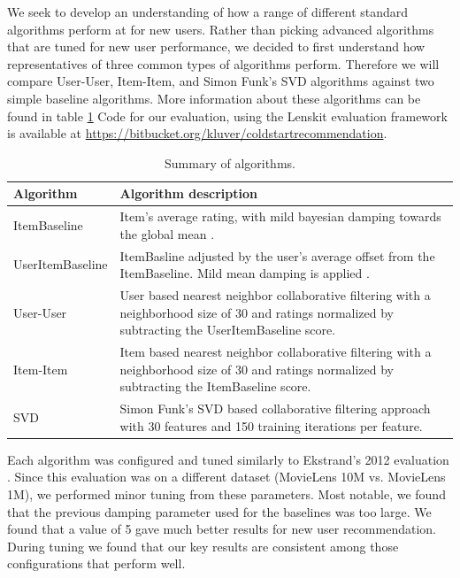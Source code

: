 \documentclass[letterpaper]{sig-alternate}
\begin{document}
  We seek to develop an understanding of how a range of different standard algorithms perform at for new users.
  Rather than picking advanced algorithms that are tuned for new user performance, we decided to first understand how representatives of three common types of algorithms perform.
  Therefore we will compare User-User, Item-Item, and Simon Funk's SVD algorithms against two simple baseline algorithms.
  More information about these algorithms can be found in table \ref{tbl:algo}
  Code for our evaluation, using the Lenskit evaluation framework \cite{lenskit} is available at \url{https://bitbucket.org/kluver/coldstartrecommendation}.
  
  \begin{table}
    \centering
    \begin{tabular}{|p{6em}|p{18em}|}
      \hline
      Algorithm          & Algorithm description \\\hline
      ItemBaseline       & Item's average rating, with mild bayesian damping towards the global mean \cite{funk_netflix_2006}. \\\hline
      UserItem\-Baseline & ItemBasline adjusted by the user's average offset from the ItemBaseline. Mild mean damping is applied \cite{funk_netflix_2006}. \\\hline
      User-User          & User based nearest neighbor collaborative filtering \cite{resnick1994grouplens} with a neighborhood size of 30 and ratings normalized by subtracting the UserItemBaseline score. \\\hline
      Item-Item          & Item based nearest neighbor collaborative filtering \cite{sarwar2001item} with a neighborhood size of 30 and ratings normalized by subtracting the ItemBaseline score.   \\\hline
      SVD                & Simon Funk's SVD based collaborative filtering approach \cite{funk_netflix_2006} with 30 features and 150 training iterations per feature. \\\hline
    \end{tabular}
    \caption{Summary of algorithms.}
    \label{tbl:algo}
  \end{table}
  
  Each algorithm was configured and tuned similarly to Ekstrand's 2012 evaluation \cite{ekstrand2012recommenders}.
  Since this evaluation was on a different dataset (MovieLens 10M vs. MovieLens 1M), we performed minor tuning from these parameters.
  Most notable, we found that the previous damping parameter used for the baselines was too large.
  We found that a value of 5 gave much better results for new user recommendation.
  During tuning we found that our key results are consistent among those configurations that perform well.
\end{document}

